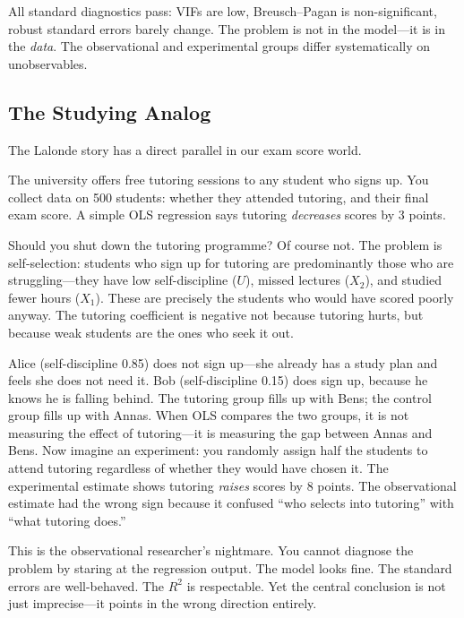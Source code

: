 \documentclass[11pt,a4paper]{article}
\theoremstyle{definition}
\theoremstyle{plain}
\theoremstyle{remark}
\begin{document}
All standard diagnostics pass: VIFs are low, Breusch--Pagan is non-significant, robust standard errors barely change.
The problem is not in the model---it is in the \emph{data}.
The observational and experimental groups differ systematically on unobservables.

\subsection{The Studying Analog}

The Lalonde story has a direct parallel in our exam score world.

\begin{toystory}[title={Does Tutoring Help?}]
The university offers free tutoring sessions to any student who signs up. You collect data on 500 students: whether they attended tutoring, and their final exam score. A simple OLS regression says tutoring \emph{decreases} scores by 3 points.

Should you shut down the tutoring programme? Of course not. The problem is self-selection: students who sign up for tutoring are predominantly those who are struggling---they have low self-discipline ($U$), missed lectures ($X_2$), and studied fewer hours ($X_1$). These are precisely the students who would have scored poorly anyway. The tutoring coefficient is negative not because tutoring hurts, but because weak students are the ones who seek it out.

Alice (self-discipline 0.85) does not sign up---she already has a study plan and feels she does not need it. Bob (self-discipline 0.15) does sign up, because he knows he is falling behind. The tutoring group fills up with Bens; the control group fills up with Annas. When OLS compares the two groups, it is not measuring the effect of tutoring---it is measuring the gap between Annas and Bens. Now imagine an experiment: you randomly assign half the students to attend tutoring regardless of whether they would have chosen it. The experimental estimate shows tutoring \emph{raises} scores by 8 points. The observational estimate had the wrong sign because it confused ``who selects into tutoring'' with ``what tutoring does.''
\end{toystory}

This is the observational researcher's nightmare. You cannot diagnose the problem by staring at the regression output. The model looks fine. The standard errors are well-behaved. The $R^2$ is respectable. Yet the central conclusion is not just imprecise---it points in the wrong direction entirely.
\end{document}
